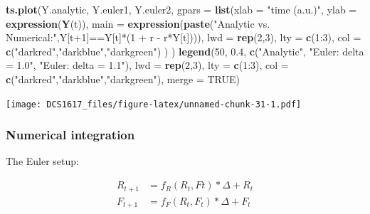 \documentclass[]{book}
\newenvironment{Shaded}{\begin{snugshade}}{\end{snugshade}}
\newcommand{\KeywordTok}[1]{\textcolor[rgb]{0.13,0.29,0.53}{\textbf{{#1}}}}
\newcommand{\DataTypeTok}[1]{\textcolor[rgb]{0.13,0.29,0.53}{{#1}}}
\newcommand{\DecValTok}[1]{\textcolor[rgb]{0.00,0.00,0.81}{{#1}}}
\newcommand{\FloatTok}[1]{\textcolor[rgb]{0.00,0.00,0.81}{{#1}}}
\newcommand{\StringTok}[1]{\textcolor[rgb]{0.31,0.60,0.02}{{#1}}}
\newcommand{\OtherTok}[1]{\textcolor[rgb]{0.56,0.35,0.01}{{#1}}}
\newcommand{\NormalTok}[1]{{#1}}
\begin{document}
\begin{Shaded}
\begin{Highlighting}[]
\KeywordTok{ts.plot}\NormalTok{(Y.analytic, Y.euler1, Y.euler2,}
        \DataTypeTok{gpars =} \KeywordTok{list}\NormalTok{(}\DataTypeTok{xlab =} \StringTok{"time (a.u.)"}\NormalTok{,}
                     \DataTypeTok{ylab =} \KeywordTok{expression}\NormalTok{(}\KeywordTok{Y}\NormalTok{(t)),}
                     \DataTypeTok{main =} \KeywordTok{expression}\NormalTok{(}\KeywordTok{paste}\NormalTok{(}\StringTok{"Analytic vs. Numerical:"}\NormalTok{,Y[t}\DecValTok{+1}\NormalTok{]==Y[t]*(}\DecValTok{1} \NormalTok{+}\StringTok{ }\NormalTok{r -}\StringTok{ }\NormalTok{r*Y[t]))),}
                     \DataTypeTok{lwd =} \KeywordTok{rep}\NormalTok{(}\DecValTok{2}\NormalTok{,}\DecValTok{3}\NormalTok{),}
                     \DataTypeTok{lty =} \KeywordTok{c}\NormalTok{(}\DecValTok{1}\NormalTok{:}\DecValTok{3}\NormalTok{),}
                     \DataTypeTok{col =} \KeywordTok{c}\NormalTok{(}\StringTok{"darkred"}\NormalTok{,}\StringTok{"darkblue"}\NormalTok{,}\StringTok{"darkgreen"}\NormalTok{)}
                     \NormalTok{)}
        \NormalTok{)}
\KeywordTok{legend}\NormalTok{(}\DecValTok{50}\NormalTok{, }\FloatTok{0.4}\NormalTok{, }\KeywordTok{c}\NormalTok{(}\StringTok{"Analytic"}\NormalTok{,}
                 \StringTok{"Euler: delta = 1.0"}\NormalTok{, }
                 \StringTok{"Euler: delta = 1.1"}\NormalTok{),}
       \DataTypeTok{lwd =} \KeywordTok{rep}\NormalTok{(}\DecValTok{2}\NormalTok{,}\DecValTok{3}\NormalTok{), }\DataTypeTok{lty =} \KeywordTok{c}\NormalTok{(}\DecValTok{1}\NormalTok{:}\DecValTok{3}\NormalTok{), }\DataTypeTok{col =} \KeywordTok{c}\NormalTok{(}\StringTok{"darkred"}\NormalTok{,}\StringTok{"darkblue"}\NormalTok{,}\StringTok{"darkgreen"}\NormalTok{), }\DataTypeTok{merge =} \OtherTok{TRUE}\NormalTok{)}
\end{Highlighting}
\end{Shaded}

\texttt{[image: DCS1617\_files/figure-latex/unnamed-chunk-31-1.pdf]}

\subsubsection*{Numerical integration}\label{numerical-integration-1}

The Euler setup:

\begin{align}
R_{t+1} &= f_R(R_t,Ft) * \Delta + R_t \\
F_{t+1} &= f_F(R_t,F_t) * \Delta + F_t
\end{align}
\end{document}
